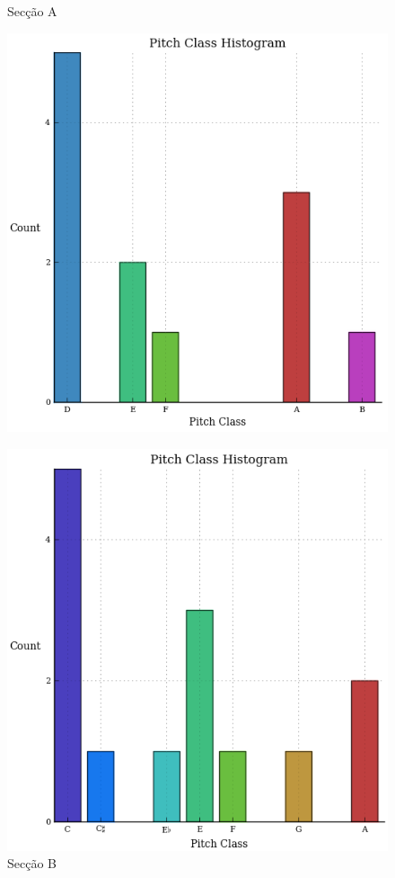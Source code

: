 \documentclass[
	12pt,				%
	openright,			%
	twoside,			%
	a4paper,			%
	english,			%
	french,				%
	spanish,			%
	brazil				%
	]{abntex2}
\begin{document}
\begin{figure}[htb]
 \centering
  \begin{minipage}{0.4\textwidth}
    \centering
    \caption{Secção A} \label{fig_minipage_imagem1}
    \includegraphics[scale=0.6]{mikro/A.png}
  \end{minipage}
  \hfill
  \begin{minipage}{0.4\textwidth}
    \centering
    \caption{Secção B} \label{fig_minipage_grafico2}
    \includegraphics[scale=0.6]{mikro/B.png}
  \end{minipage}
\end{figure}
\end{document}
